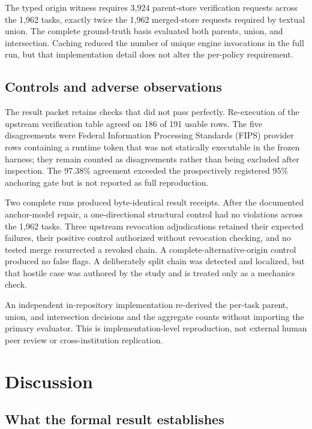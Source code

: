 \documentclass[pdflatex,sn-mathphys-num]{sn-jnl}
\begin{document}
The typed origin witness requires 3,924 parent-store verification requests across the 1,962 tasks, exactly twice the 1,962 merged-store requests required by textual union. The complete ground-truth basis evaluated both parents, union, and intersection. Caching reduced the number of unique engine invocations in the full run, but that implementation detail does not alter the per-policy requirement.

\subsection{Controls and adverse observations}\label{controls-and-adverse-observations}

The result packet retains checks that did not pass perfectly. Re-execution of the upstream verification table agreed on 186 of 191 usable rows. The five disagreements were Federal Information Processing Standards (FIPS) provider rows containing a runtime token that was not statically executable in the frozen harness; they remain counted as disagreements rather than being excluded after inspection. The 97.38\% agreement exceeded the prospectively registered 95\% anchoring gate but is not reported as full reproduction.

Two complete runs produced byte-identical result receipts. After the documented anchor-model repair, a one-directional structural control had no violations across the 1,962 tasks. Three upstream revocation adjudications retained their expected failures, their positive control authorized without revocation checking, and no tested merge resurrected a revoked chain. A complete-alternative-origin control produced no false flags. A deliberately split chain was detected and localized, but that hostile case was authored by the study and is treated only as a mechanics check.

An independent in-repository implementation re-derived the per-task parent, union, and intersection decisions and the aggregate counts without importing the primary evaluator. This is implementation-level reproduction, not external human peer review or cross-institution replication.

\section{Discussion}\label{discussion}

\subsection{What the formal result establishes}\label{what-the-formal-result-establishes}
\end{document}
